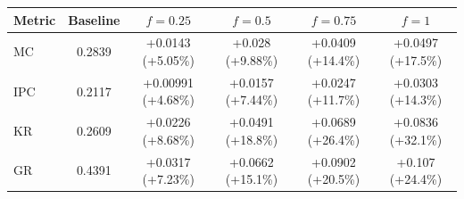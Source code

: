 \begin{tabular}{lccccc}
\toprule
Metric & Baseline & $f=0.25$ & $f=0.5$ & $f=0.75$ & $f=1$ \\
\midrule
MC & 0.2839 & +0.0143 (+5.05\%) & +0.028 (+9.88\%) & +0.0409 (+14.4\%) & +0.0497 (+17.5\%) \\
IPC & 0.2117 & +0.00991 (+4.68\%) & +0.0157 (+7.44\%) & +0.0247 (+11.7\%) & +0.0303 (+14.3\%) \\
KR & 0.2609 & +0.0226 (+8.68\%) & +0.0491 (+18.8\%) & +0.0689 (+26.4\%) & +0.0836 (+32.1\%) \\
GR & 0.4391 & +0.0317 (+7.23\%) & +0.0662 (+15.1\%) & +0.0902 (+20.5\%) & +0.107 (+24.4\%) \\
\bottomrule
\end{tabular}
